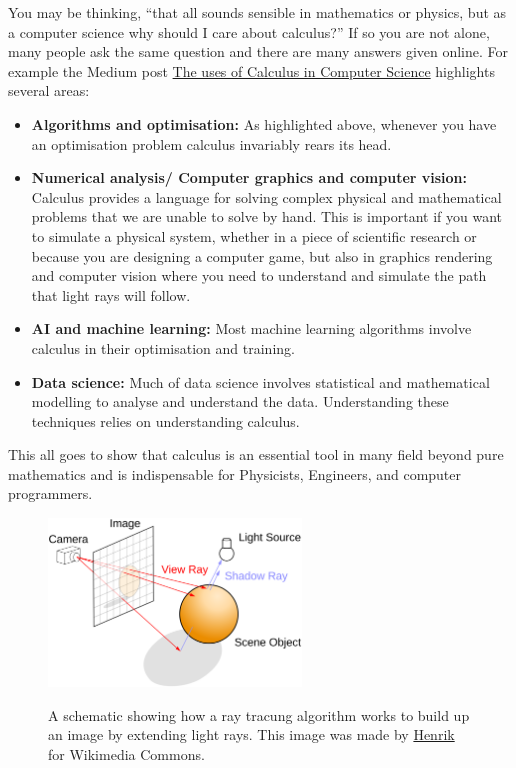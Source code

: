 You may be thinking, ``that all sounds sensible in mathematics or physics, but as a computer science why should I care about calculus?'' If so you are not alone, many people ask the same question and there are many answers given online. For example the Medium post \href{https://medium.com/@18bhavyasharma/the-use-of-calculus-in-computer-science-a6917dbe33b9}{The uses of Calculus in Computer Science} highlights several areas:
\begin{itemize}
    \item \textbf{Algorithms and optimisation:}  As highlighted above, whenever you have an optimisation problem calculus invariably rears its head.
    \item \textbf{Numerical analysis/ Computer graphics and computer vision:} Calculus provides a language for solving complex physical and mathematical problems that we are unable to solve by hand. This is important if you want to simulate a physical system, whether in a piece of scientific research or because you are designing a computer game, but also in graphics rendering and computer vision where you need to understand and simulate the path that light rays will follow.
   \item \textbf{AI and machine learning:} Most machine learning algorithms involve calculus in their optimisation and training.
   \item \textbf{Data science:} Much of data science involves statistical and mathematical modelling to analyse and understand the data. Understanding these techniques relies on understanding calculus. 
\end{itemize}
This all goes to show that calculus is an essential tool in many field beyond pure mathematics and is indispensable for Physicists, Engineers, and computer programmers. \\

\begin{figure}[ht]
    \centering
    \includegraphics[width=0.6\textwidth, alt = {A schematic of ray tracing.}]{figures/Ray_trace_diagram}
    \caption{A schematic showing how a ray tracung algorithm works to build up an image by extending light rays. This image was made by \href{https://commons.wikimedia.org/wiki/File:Ray\_trace\_diagram.svg}{Henrik} for Wikimedia Commons.}
\label{fig: ray tracing}
\end{figure}


